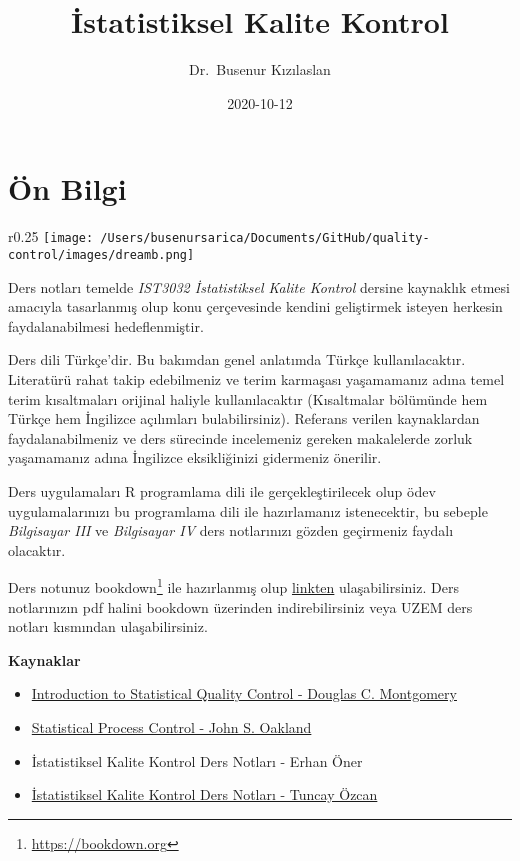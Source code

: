\documentclass[
]{book}
\title{İstatistiksel Kalite Kontrol}
\author{Dr.~Busenur Kızılaslan}
\date{2020-10-12}
\begin{document}
\maketitle

{
\setcounter{tocdepth}{1}
\tableofcontents
}
\hypertarget{uxf6n-bilgi}{%
\chapter{Ön Bilgi}\label{uxf6n-bilgi}}

\begin{wrapfigure}{r}{0.25\textwidth}
    \centering
    \texttt{[image: /Users/busenursarica/Documents/GitHub/quality-control/images/dreamb.png]}
\end{wrapfigure}

Ders notları temelde \emph{IST3032 İstatistiksel Kalite Kontrol} dersine kaynaklık etmesi amacıyla tasarlanmış olup konu çerçevesinde kendini geliştirmek isteyen herkesin faydalanabilmesi hedeflenmiştir.

Ders dili Türkçe'dir. Bu bakımdan genel anlatımda Türkçe kullanılacaktır. Literatürü rahat takip edebilmeniz ve terim karmaşası yaşamamanız adına temel terim kısaltmaları orijinal haliyle kullanılacaktır (Kısaltmalar bölümünde hem Türkçe hem İngilizce açılımları bulabilirsiniz). Referans verilen kaynaklardan faydalanabilmeniz ve ders sürecinde incelemeniz gereken makalelerde zorluk yaşamamanız adına İngilizce eksikliğinizi gidermeniz önerilir.

Ders uygulamaları R programlama dili ile gerçekleştirilecek olup ödev uygulamalarınızı bu programlama dili ile hazırlamanız istenecektir, bu sebeple \emph{Bilgisayar III} ve \emph{Bilgisayar IV} ders notlarınızı gözden geçirmeniz faydalı olacaktır.

Ders notunuz bookdown\footnote{\url{https://bookdown.org}} ile hazırlanmış olup \href{https://busenurk.github.io/quality-control/_book/index.html}{linkten} ulaşabilirsiniz. Ders notlarınızın pdf halini bookdown üzerinden indirebilirsiniz veya UZEM ders notları kısmından ulaşabilirsiniz.

\textbf{Kaynaklar}

\begin{itemize}
\item
  \href{http://endustri.eskisehir.edu.tr/ipoyraz/TKY302/icerik/text\%20book_montgomery_6th\%20edition.pdf}{Introduction to Statistical Quality Control - Douglas C. Montgomery}
\item
  \href{http://www.diliev.com/Home/materiali/KHEA/referati/6812268-Statistical-Process-Control-eBook-VG.pdf}{Statistical Process Control - John S. Oakland}
\item
  İstatistiksel Kalite Kontrol Ders Notları - Erhan Öner
\item
  \href{http://auzefkitap.istanbul.edu.tr/kitap/endustrimuhlt_ue/istatistikselkalitekontrolu.pdf}{İstatistiksel Kalite Kontrol Ders Notları - Tuncay Özcan}
\end{itemize}
\end{document}
